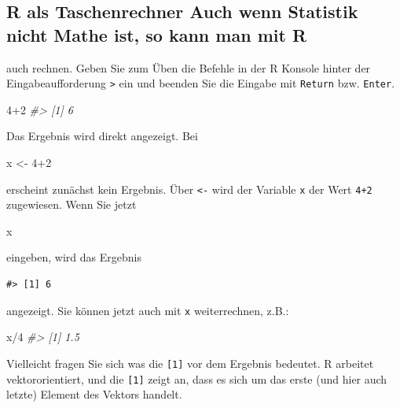 \documentclass[12pt,]{book}
\makeatletter
\newenvironment{Shaded}{\begin{snugshade}}{\end{snugshade}}
\newcommand{\DecValTok}[1]{\textcolor[rgb]{0.00,0.00,0.81}{{#1}}}
\newcommand{\StringTok}[1]{\textcolor[rgb]{0.31,0.60,0.02}{{#1}}}
\newcommand{\CommentTok}[1]{\textcolor[rgb]{0.56,0.35,0.01}{\textit{{#1}}}}
\newcommand{\NormalTok}[1]{{#1}}
\newenvironment{kframe}{%
\medskip{}
\setlength{\fboxsep}{.8em}
 \def\at@end@of@kframe{}%
 \ifinner\ifhmode%
  \def\at@end@of@kframe{\end{minipage}}%
  \begin{minipage}{\columnwidth}%
 \fi\fi%
 \def\FrameCommand##1{\hskip\@totalleftmargin \hskip-\fboxsep
 \colorbox{shadecolor}{##1}\hskip-\fboxsep
     \hskip-\linewidth \hskip-\@totalleftmargin \hskip\columnwidth}%
 \MakeFramed {\advance\hsize-\width
   \@totalleftmargin\z@ \linewidth\hsize
   \@setminipage}}%
 {\par\unskip\endMakeFramed%
 \at@end@of@kframe}
\renewenvironment{Shaded}{\begin{kframe}}{\end{kframe}}
\makeatother
\begin{document}
\subsection{R als Taschenrechner Auch wenn Statistik nicht Mathe ist, so
kann man mit
R}\label{r-als-taschenrechner-auch-wenn-statistik-nicht-mathe-ist-so-kann-man-mit-r}

auch rechnen. Geben Sie zum Üben die Befehle in der R Konsole hinter der
Eingabeaufforderung \texttt{\textgreater{}} ein und beenden Sie die
Eingabe mit \texttt{Return} bzw. \texttt{Enter}.

\begin{Shaded}
\begin{Highlighting}[]
\DecValTok{4+2} 
\CommentTok{#> [1] 6}
\end{Highlighting}
\end{Shaded}

Das Ergebnis wird direkt angezeigt. Bei

\begin{Shaded}
\begin{Highlighting}[]
\NormalTok{x <-}\StringTok{ }\DecValTok{4+2} 
\end{Highlighting}
\end{Shaded}

erscheint zunächst kein Ergebnis. Über \texttt{\textless{}-} wird der
Variable \texttt{x} der Wert \texttt{4+2} zugewiesen. Wenn Sie jetzt

\begin{Shaded}
\begin{Highlighting}[]
\NormalTok{x }
\end{Highlighting}
\end{Shaded}

eingeben, wird das Ergebnis

\begin{verbatim}
#> [1] 6
\end{verbatim}

angezeigt. Sie können jetzt auch mit \texttt{x} weiterrechnen, z.B.:

\begin{Shaded}
\begin{Highlighting}[]
\NormalTok{x/}\DecValTok{4} 
\CommentTok{#> [1] 1.5}
\end{Highlighting}
\end{Shaded}

Vielleicht fragen Sie sich was die \texttt{{[}1{]}} vor dem Ergebnis
bedeutet. R arbeitet vektororientiert, und die \texttt{{[}1{]}} zeigt
an, dass es sich um das erste (und hier auch letzte) Element des Vektors
handelt.
\end{document}

